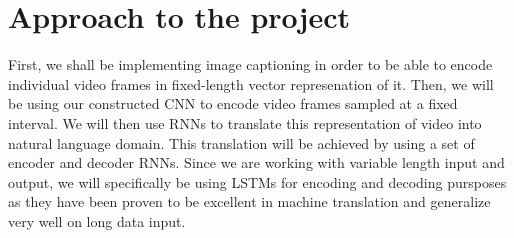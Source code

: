 \documentclass{article}
\begin{document}
			


	\section{Approach to the project}
		First, we shall be implementing image captioning in order to be able to encode individual video frames in fixed-length vector represenation of it.
		Then, we will be using our constructed CNN to encode video frames sampled at a fixed interval.
		We will then use RNNs to translate this representation of video into natural language domain. This translation will be achieved by using a set of encoder and decoder RNNs. Since we are working with variable length input and output, we will specifically be using LSTMs for encoding and decoding pursposes as they have been proven to be excellent in machine translation and generalize very well on long data input.
\end{document}
